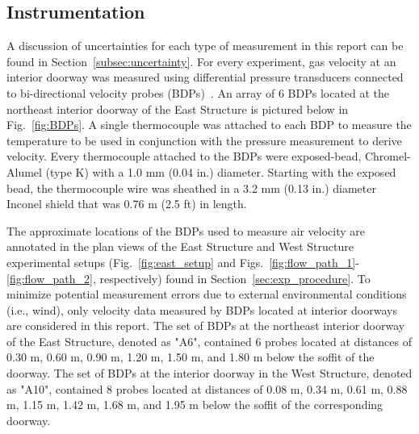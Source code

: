 \documentclass[12pt,oneside]{book}
\begin{document}
\subsection{Instrumentation}
\label{subsec:instrumentation}
A discussion of uncertainties for each type of measurement in this report can be found in Section~\ref{subsec:uncertainty}. For every experiment, gas velocity at an interior doorway was measured using differential pressure transducers connected to bi-directional velocity probes (BDPs)~\cite{McCaffrey:Combustion_and_Flame}. An array of 6 BDPs located at the northeast interior doorway of the East Structure is pictured below in Fig.~\ref{fig:BDPs}. A single thermocouple was attached to each BDP to measure the temperature to be used in conjunction with the pressure measurement to derive velocity. Every thermocouple attached to the BDPs were exposed-bead, Chromel-Alumel (type K) with a 1.0 mm (0.04 in.) diameter. Starting with the exposed bead, the thermocouple wire was sheathed in a 3.2 mm (0.13 in.) diameter Inconel shield that was 0.76 m (2.5 ft) in length. 

The approximate locations of the BDPs used to measure air velocity are annotated in the plan views of the East Structure and West Structure experimental setups (Fig.~\ref{fig:east_setup} and Figs.~\ref{fig:flow_path_1}-\ref{fig:flow_path_2}, respectively) found in Section~\ref{sec:exp_procedure}. To minimize potential measurement errors due to external environmental conditions (i.e., wind), only velocity data measured by BDPs located at interior doorways are considered in this report. The set of BDPs at the northeast interior doorway of the East Structure, denoted as "A6", contained 6 probes located at distances of 0.30 m, 0.60 m, 0.90 m, 1.20 m, 1.50 m, and 1.80 m below the soffit of the doorway. The set of BDPs at the interior doorway in the West Structure, denoted as "A10", contained 8 probes located at distances of 0.08 m, 0.34 m, 0.61 m, 0.88 m, 1.15 m, 1.42 m, 1.68 m, and 1.95 m below the soffit of the corresponding doorway.
\end{document}
